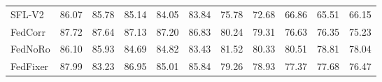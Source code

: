 \begin{table}[t]
\begin{center}
{\begin{tabular}{l|llllllllll}
SFL-V2                                & \multicolumn{1}{c}{86.07}     & \multicolumn{1}{c}{85.78}      & \multicolumn{1}{c}{85.14}      & \multicolumn{1}{c}{84.05}      & \multicolumn{1}{c}{83.84}      & \multicolumn{1}{c}{75.78}      & \multicolumn{1}{c}{72.68}      & \multicolumn{1}{c}{66.86}      & \multicolumn{1}{c}{65.51}    &  \multicolumn{1}{c}{66.15}   \\ 
FedCorr                                          & \multicolumn{1}{c}{87.72}      & \multicolumn{1}{c}{87.64}      & \multicolumn{1}{c}{87.13}      & \multicolumn{1}{c}{87.20}      & \multicolumn{1}{c}{86.83}      & \multicolumn{1}{c}{80.24}      & \multicolumn{1}{c}{79.31}      & \multicolumn{1}{c}{76.63}      & \multicolumn{1}{c}{76.35}      &    \multicolumn{1}{c}{75.23}   \\ 
FedNoRo                                          & \multicolumn{1}{c}{86.10}      & \multicolumn{1}{c}{85.93}      & \multicolumn{1}{c}{84.69}      & \multicolumn{1}{c}{84.82}      & \multicolumn{1}{c}{83.43}      & \multicolumn{1}{c}{81.52}      & \multicolumn{1}{c}{80.33}      & \multicolumn{1}{c}{80.51}      & \multicolumn{1}{c}{78.81}      &    \multicolumn{1}{c}{78.04}   \\ 
FedFixer                                       & \multicolumn{1}{c}{87.99}      & \multicolumn{1}{c}{83.23}      & \multicolumn{1}{c}{86.95}      & \multicolumn{1}{c}{85.01}      & \multicolumn{1}{c}{85.84}      & \multicolumn{1}{c}{79.26}      & \multicolumn{1}{c}{78.93}      & \multicolumn{1}{c}{77.37}      & \multicolumn{1}{c}{77.68}      &    \multicolumn{1}{c}{76.47}   \\ \hline
\end{tabular}
}
\label{table:compare fmnist}
\end{center}
\end{table}


